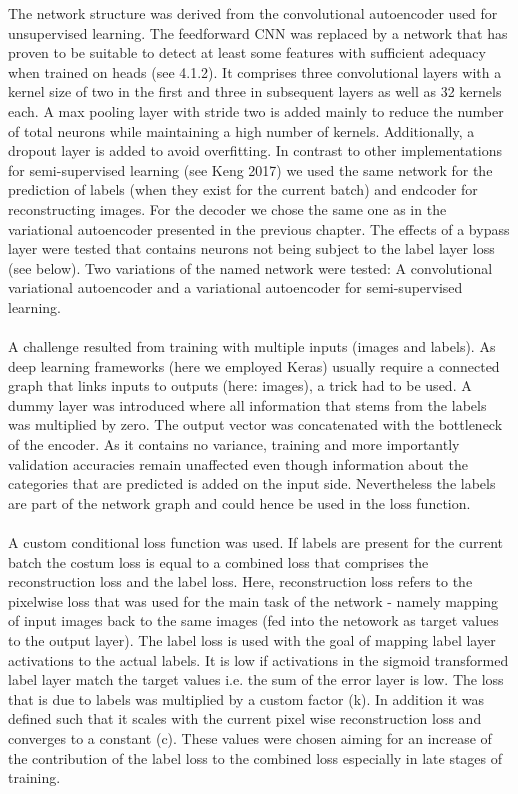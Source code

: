 The network structure was derived from the convolutional autoencoder used for unsupervised learning. The feedforward CNN was replaced by a network that has proven to be suitable to detect at least some features with sufficient adequacy when trained on heads (see 4.1.2). It comprises three convolutional layers with a kernel size of two in the first and three in subsequent layers as well as 32 kernels each. A max pooling layer with stride two is added mainly to reduce the number of total neurons while maintaining a high number of kernels. Additionally, a dropout layer is added to avoid overfitting. In contrast to other implementations for semi-supervised learning (see Keng 2017)  we used the same network for the prediction of labels (when they exist for the current batch) and endcoder for reconstructing images. For the decoder we chose the same one as in the variational autoencoder presented in the previous chapter. The effects of a bypass layer were tested that contains neurons not being subject to the label layer loss (see below). Two variations of the named network were tested: A convolutional variational autoencoder and a variational autoencoder for semi-supervised learning.\\
\\
A challenge resulted from training with multiple inputs (images and labels). As deep learning frameworks (here we employed Keras) usually require a connected graph that links inputs to outputs (here: images), a trick had to be used. A dummy layer was introduced where all information that stems from the labels was multiplied by zero. The output vector was concatenated with the bottleneck of the encoder. As it contains no variance, training and more importantly validation accuracies remain unaffected even though information about the categories that are predicted is added on the input side. Nevertheless the labels are part of the network graph and could hence be used in the loss function.  \\
\\
A custom conditional loss function was used. If labels are present for the current batch the costum loss is equal to a combined loss that comprises the reconstruction loss and the label loss. Here, reconstruction loss refers to the pixelwise loss that was used for the main task of the network - namely mapping of input images back to the same images (fed into the netowork as target values to the output layer). The label loss is used with the goal of mapping label layer activations to the actual labels. It is low if activations in the sigmoid transformed label layer match the target values i.e. the sum of the error layer is low. The loss that is due to labels was multiplied by a custom factor (k). In addition it was defined such that it scales with the current pixel wise reconstruction loss and converges to a constant (c). These values were chosen aiming for an increase of the contribution of the label loss to the combined loss especially in late stages of training.\\

